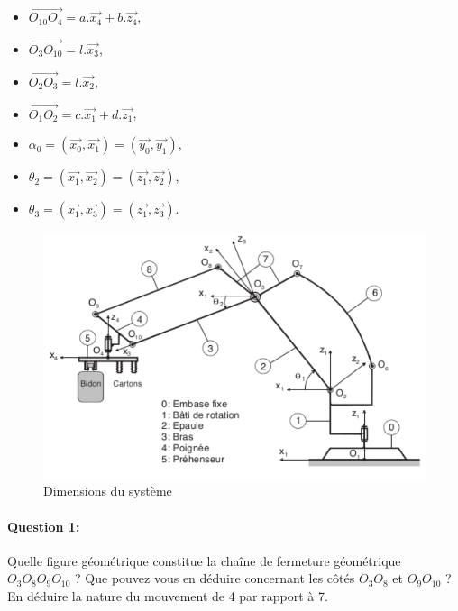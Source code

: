  \begin{minipage}{0.5\linewidth}
\begin{itemize}
 \item $\overrightarrow{O_{10}O_4}=a.\overrightarrow{x_4}+b.\overrightarrow{z_4}$,
 \item $\overrightarrow{O_3O_{10}}=l.\overrightarrow{x_3}$,
 \item $\overrightarrow{O_2O_3}=l.\overrightarrow{x_2}$,
 \item $\overrightarrow{O_1O_2}=c.\overrightarrow{x_1}+d.\overrightarrow{z_1}$,
\end{itemize} 
 \end{minipage} \hfill
 \begin{minipage}{0.5\linewidth}
\begin{itemize}
 \item $\alpha_0=(\overrightarrow{x_0},\overrightarrow{x_1})=(\overrightarrow{y_0},\overrightarrow{y_1})$,
 \item $\theta_2=(\overrightarrow{x_1},\overrightarrow{x_2})=(\overrightarrow{z_1},\overrightarrow{z_2})$,
 \item $\theta_3=(\overrightarrow{x_1},\overrightarrow{x_3})=(\overrightarrow{z_1},\overrightarrow{z_3})$.
\end{itemize}
 \end{minipage}


\begin{figure}[!h]
  \centering\includegraphics[width=0.7\linewidth]{img/annexe_robot}
  \caption{Dimensions du système}
  \label{img:image104}
\end{figure}


\paragraph{Question 1:} Quelle figure géométrique constitue la chaîne de fermeture géométrique $O_3O_8O_9O_{10}$ ? Que pouvez vous en déduire concernant les côtés $O_3O_8$ et $O_9O_{10}$ ? En déduire la nature du mouvement de 4 par rapport à 7.


